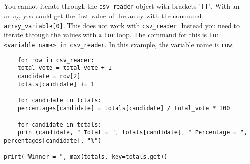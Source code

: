 \documentclass[11pt]{article}
\begin{document}
\begin{verbatim}



\end{verbatim}


You cannot iterate through the \texttt{csv\_reader} object with brackets "\texttt{[]}". With an array, you could get the first value of the array with the command \texttt{array\_variable[0]}. This does not work with \texttt{csv\_reader}. Instead you need to iterate through the values with a \texttt{for} loop. The command for this is 
\texttt{for <variable name> in csv\_reader}. In this example, the variable name is \texttt{row}. 

\begin{verbatim}
    for row in csv_reader:
	total_vote = total_vote + 1
	candidate = row[2]
	totals[candidate] += 1

    for candidate in totals:
	percentages[candidate] = totals[candidate] / total_vote * 100

    for candidate in totals:
	print(candidate, " Total = ", totals[candidate], " Percentage = ", percentages[candidate], "%")

print("Winner = ", max(totals, key=totals.get))
\end{verbatim}
\end{document}
